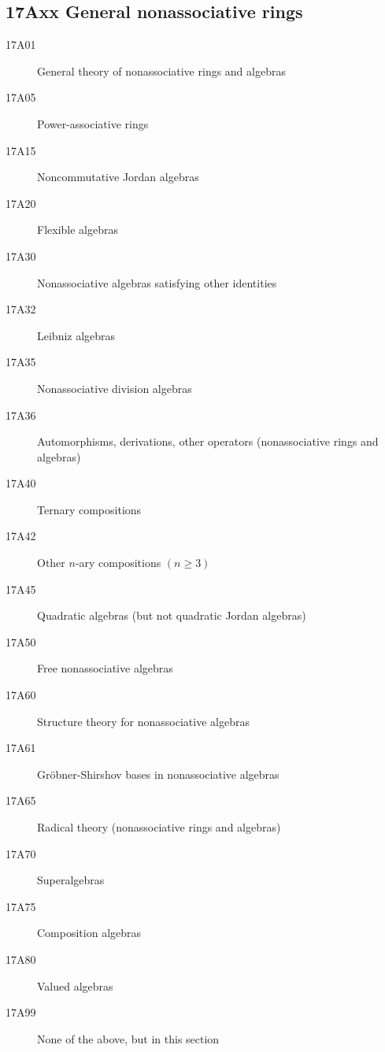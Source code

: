 \subsection*{17Axx  General nonassociative rings }\label{17Axx}
\begin{description}  
\item [17A01]\label{17A01} General theory of nonassociative rings and algebras
\item [17A05]\label{17A05} Power-associative rings
\item [17A15]\label{17A15} Noncommutative Jordan algebras
\item [17A20]\label{17A20} Flexible algebras
\item [17A30]\label{17A30} Nonassociative algebras satisfying other identities
\item [17A32]\label{17A32} Leibniz algebras
\item [17A35]\label{17A35} Nonassociative division algebras
\item [17A36]\label{17A36} Automorphisms, derivations, other operators (nonassociative rings and algebras)
\item [17A40]\label{17A40} Ternary compositions
\item [17A42]\label{17A42} Other $n$-ary compositions $(n \ge 3)$
\item [17A45]\label{17A45} Quadratic algebras (but not quadratic Jordan algebras)
\item [17A50]\label{17A50} Free nonassociative algebras
\item [17A60]\label{17A60} Structure theory for nonassociative algebras
\item [17A61]\label{17A61} Gr\"obner-Shirshov bases in nonassociative algebras
\item [17A65]\label{17A65} Radical theory (nonassociative rings and algebras)
\item [17A70]\label{17A70} Superalgebras
\item [17A75]\label{17A75} Composition algebras
\item [17A80]\label{17A80} Valued algebras
\item [17A99]\label{17A99} None of the above, but in this section
\end{description}
